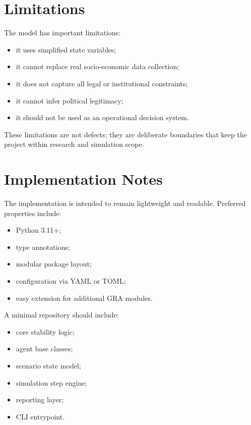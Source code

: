 \documentclass[11pt,a4paper]{article}
\begin{document}
\section{Limitations}

The model has important limitations:

\begin{itemize}[leftmargin=1.5em]
    \item it uses simplified state variables;
    \item it cannot replace real socio-economic data collection;
    \item it does not capture all legal or institutional constraints;
    \item it cannot infer political legitimacy;
    \item it should not be used as an operational decision system.
\end{itemize}

These limitations are not defects; they are deliberate boundaries that keep the project within research and simulation scope.

\section{Implementation Notes}

The implementation is intended to remain lightweight and readable. Preferred properties include:
\begin{itemize}[leftmargin=1.5em]
    \item Python 3.11+;
    \item type annotations;
    \item modular package layout;
    \item configuration via YAML or TOML;
    \item easy extension for additional GRA modules.
\end{itemize}

A minimal repository should include:
\begin{itemize}[leftmargin=1.5em]
    \item core stability logic;
    \item agent base classes;
    \item scenario state model;
    \item simulation step engine;
    \item reporting layer;
    \item CLI entrypoint.
\end{itemize}
\end{document}
